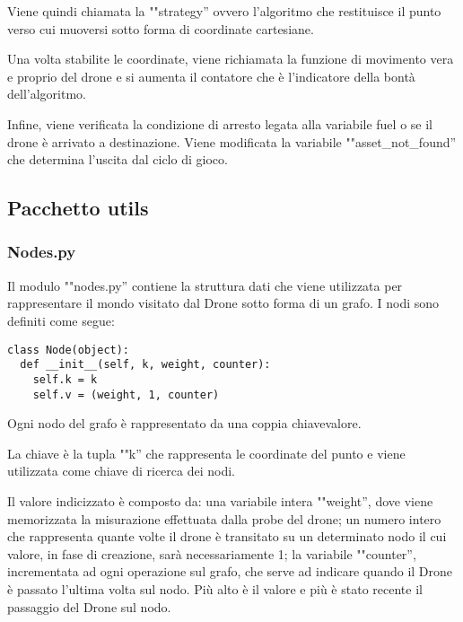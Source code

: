 Viene quindi chiamata la ""strategy'' ovvero l'algoritmo che restituisce il punto verso cui muoversi sotto forma di coordinate cartesiane. 

Una volta stabilite le coordinate, viene richiamata la funzione di movimento vera e proprio del drone e si aumenta il contatore che è  l'indicatore della bontà dell'algoritmo. 

Infine, viene verificata la condizione di arresto legata alla variabile fuel o se il drone è arrivato a destinazione. Viene modificata la variabile ""asset\_not\_found'' che determina l'uscita dal ciclo di gioco.

\subsection{Pacchetto utils}

\subsubsection{Nodes.py}
Il modulo ""nodes.py'' contiene la struttura dati che viene utilizzata per rappresentare il mondo visitato dal Drone sotto forma di un grafo. I nodi sono definiti come segue:
\begin{verbatim} 
class Node(object):
  def __init__(self, k, weight, counter):
    self.k = k
    self.v = (weight, 1, counter)
\end{verbatim}
Ogni nodo del grafo è rappresentato da una coppia chiave\/valore. 

La chiave è la tupla ""k'' che rappresenta le coordinate del punto e viene utilizzata come chiave di ricerca dei nodi. 

Il valore indicizzato è composto da: una variabile intera ""weight'', dove viene memorizzata la misurazione effettuata dalla probe del drone; un numero intero che rappresenta quante volte il drone è transitato su un determinato nodo il cui valore, in fase di creazione, sarà necessariamente 1; la variabile ""counter'', incrementata ad ogni operazione sul grafo, che serve ad indicare quando il Drone è passato l'ultima volta sul nodo. Più alto è il valore e più è stato recente il passaggio del Drone sul nodo. 


